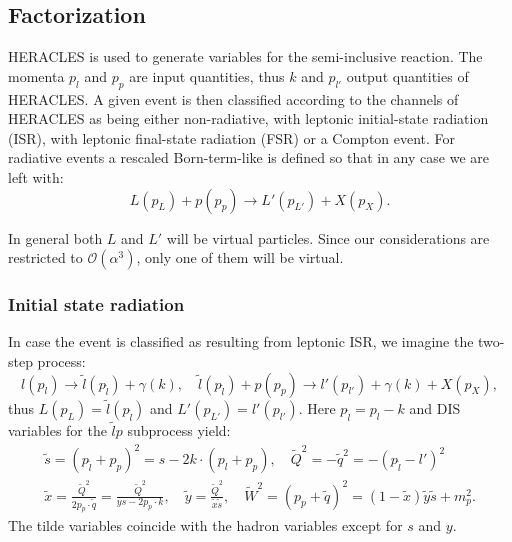\subsection{Factorization}

HERACLES is used to generate variables for the semi-inclusive reaction. The momenta $p_l$ and $p_p$ are input quantities, thus $k$ and $p_{l'}$ output quantities of HERACLES. A given event is then classified according to the channels of HERACLES as being either non-radiative, with leptonic initial-state radiation (ISR), with leptonic final-state radiation (FSR) or a Compton event. For radiative events a rescaled Born-term-like is defined so that in any case we are left with:
%
\begin{equation}
  L(p_L) + p(p_p) \rightarrow L'(p_{L'}) + X(p_X).
\end{equation}
%

In general both $L$ and $L'$ will be virtual particles. Since our considerations are restricted to $\mathscr{O}(\alpha^3)$, only one of them will be virtual.

\subsubsection*{Initial state radiation}

In case the event is classified as resulting from leptonic ISR, we imagine the two-step process:
%
\begin{equation}
  l(p_l) \rightarrow \widetilde{l}(p_{\widetilde{l}}) + \gamma(k),\quad \widetilde{l}(p_{\widetilde{l}}) + p(p_p) \rightarrow l'(p_{l'}) + \gamma(k) + X(p_X),
\end{equation}
%
thus $L(p_L) = \widetilde{l}(p_{\widetilde{l}})$ and $L'(p_{L'}) = l'(p_{l'})$. Here $p_{\widetilde{l}} = p_l - k$ and DIS variables for the $\widetilde{l}p$ subprocess yield:
%
\begin{equation}
  \begin{split}
    \widetilde{s} = (p_{\widetilde{l}}+p_p)^2 = s - 2k \cdot (p_l+p_p),\quad \widetilde{Q}^2 = -\widetilde{q}^2 = -(p_{\widetilde{l}}-l')^2 \\
    \widetilde{x} = \frac{\widetilde{Q}^2}{2p_p \cdot \widetilde{q}} = \frac{\widetilde{Q}^2}{ys-2p_p \cdot k},\quad \widetilde{y} = \frac{\widetilde{Q}^2}{\widetilde{x}\widetilde{s}},\quad \widetilde{W}^2 = (p_p+\widetilde{q})^2 = (1-\widetilde{x})\widetilde{y}\widetilde{s} + m^2_p.
  \end{split}
\end{equation}
%
The tilde variables coincide with the hadron variables except for $s$ and $y$.

